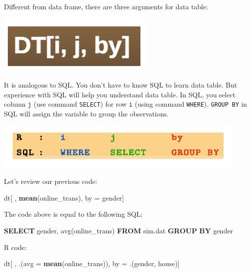 \documentclass[12pt,]{krantz}
\makeatletter
\newenvironment{Shaded}{\begin{snugshade}}{\end{snugshade}}
\newcommand{\DataTypeTok}[1]{\textcolor[rgb]{0.27,0.27,0.27}{#1}}
\newcommand{\FunctionTok}[1]{\textcolor[rgb]{0,0,0}{#1}}
\newcommand{\KeywordTok}[1]{\textcolor[rgb]{0.27,0.27,0.27}{\textbf{#1}}}
\newcommand{\NormalTok}[1]{#1}
\newcommand{\StringTok}[1]{\textcolor[rgb]{0.5,0.5,0.5}{#1}}
\newenvironment{kframe}{%
\medskip{}
\setlength{\fboxsep}{.8em}
 \def\at@end@of@kframe{}%
 \ifinner\ifhmode%
  \def\at@end@of@kframe{\end{minipage}}%
  \begin{minipage}{\columnwidth}%
 \fi\fi%
 \def\FrameCommand##1{\hskip\@totalleftmargin \hskip-\fboxsep
 \colorbox{shadecolor}{##1}\hskip-\fboxsep
     \hskip-\linewidth \hskip-\@totalleftmargin \hskip\columnwidth}%
 \MakeFramed {\advance\hsize-\width
   \@totalleftmargin\z@ \linewidth\hsize
   \@setminipage}}%
 {\par\unskip\endMakeFramed%
 \at@end@of@kframe}
\renewenvironment{Shaded}{\begin{kframe}}{\end{kframe}}
\makeatother
\begin{document}
Different from data frame, there are three arguments for data table:

\includegraphics{images/datable1.png}

It is analogous to SQL. You don't have to know SQL to learn data table. But experience with SQL will help you understand data table. In SQL, you select column \texttt{j} (use command \texttt{SELECT}) for row \texttt{i} (using command \texttt{WHERE}). \texttt{GROUP\ BY} in SQL will assign the variable to group the observations.

\includegraphics{images/rSQL.png}

Let's review our previous code:

\begin{Shaded}
\begin{Highlighting}[]
\NormalTok{dt[ , }\KeywordTok{mean}\NormalTok{(online_trans), by =}\StringTok{ }\NormalTok{gender]}
\end{Highlighting}
\end{Shaded}

The code above is equal to the following SQL:

\begin{Shaded}
\begin{Highlighting}[]
\KeywordTok{SELECT}
\NormalTok{   gender,}
   \FunctionTok{avg}\NormalTok{(online_trans) }
\KeywordTok{FROM}
\NormalTok{   sim.dat }
\KeywordTok{GROUP} \KeywordTok{BY}
\NormalTok{   gender}
\end{Highlighting}
\end{Shaded}

R code:

\begin{Shaded}
\begin{Highlighting}[]
\NormalTok{dt[ , .(}\DataTypeTok{avg =} \KeywordTok{mean}\NormalTok{(online_trans)), by =}\StringTok{ }\NormalTok{.(gender, house)]}
\end{Highlighting}
\end{Shaded}
\end{document}
